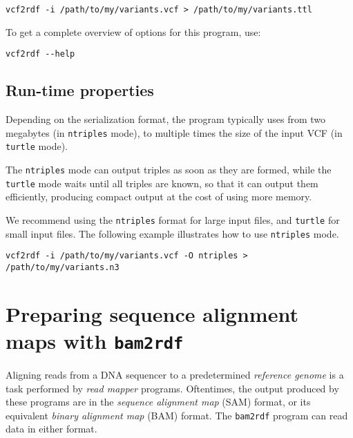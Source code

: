 \begin{siderules}
\begin{verbatim}
vcf2rdf -i /path/to/my/variants.vcf > /path/to/my/variants.ttl
\end{verbatim}
\end{siderules}

To get a complete overview of options for this program, use:
\begin{siderules}
\begin{verbatim}
vcf2rdf --help
\end{verbatim}
\end{siderules}

\subsection{Run-time properties}

  Depending on the serialization format, the program typically uses from two megabytes
  (in \texttt{ntriples} mode), to multiple times the size of the input VCF
  (in \texttt{turtle} mode).

  The \texttt{ntriples} mode can output triples as soon as they are formed, while the
  \texttt{turtle} mode waits until all triples are known, so that it can output them
  efficiently, producing compact output at the cost of using more memory.

  We recommend using the \texttt{ntriples} format for large input files, and
  \texttt{turtle} for small input files.  The following example illustrates how to
  use \texttt{ntriples} mode.

\begin{siderules}
\begin{verbatim}
vcf2rdf -i /path/to/my/variants.vcf -O ntriples > /path/to/my/variants.n3
\end{verbatim}
\end{siderules}

\section{Preparing sequence alignment maps with \texttt{bam2rdf}}

  Aligning reads from a DNA sequencer to a predetermined \emph{reference genome}
  is a task performed by \emph{read mapper} programs.  Oftentimes, the output
  produced by these programs are in the \emph{sequence alignment map} (SAM) format,
  or its equivalent \emph{binary alignment map} (BAM) format.  The \texttt{bam2rdf}
  program can read data in either format.

